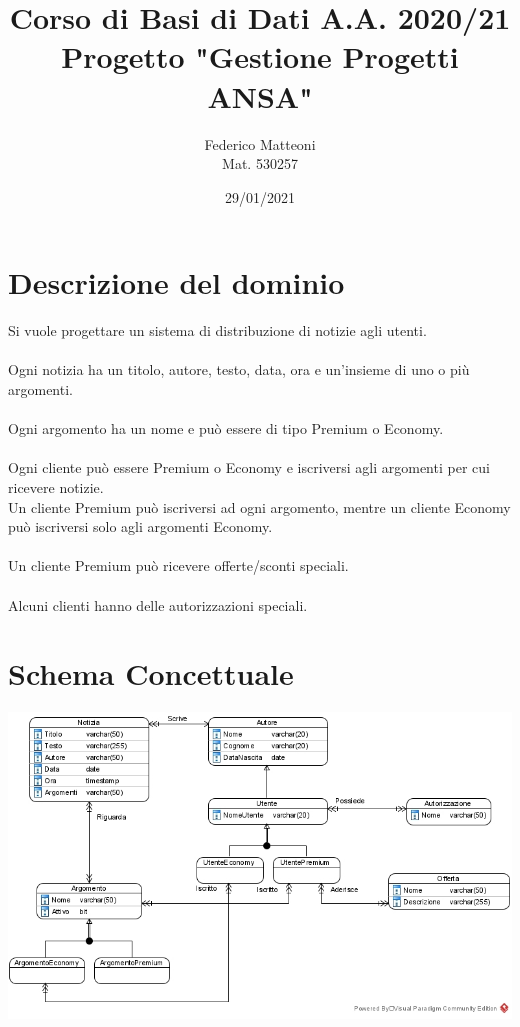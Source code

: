 \documentclass[10pt]{article}
\begin{document}
\renewcommand*\contentsname{Indice}
\title{Corso di Basi di Dati A.A. 2020/21\\Progetto "Gestione Progetti ANSA"}
\author{Federico Matteoni\\Mat. 530257}
\date{29/01/2021}
\maketitle
\pagebreak
\section{Descrizione del dominio}
Si vuole progettare un sistema di distribuzione di notizie agli utenti.\\\\
Ogni notizia ha un titolo, autore, testo, data, ora e un'insieme di uno o più argomenti.\\\\
Ogni argomento ha un nome e può essere di tipo Premium o Economy.\\\\
Ogni cliente può essere Premium o Economy e iscriversi agli argomenti per cui ricevere notizie.\\Un cliente Premium può iscriversi ad ogni argomento, mentre un cliente Economy può iscriversi solo agli argomenti Economy.\\\\
Un cliente Premium può ricevere offerte/sconti speciali.\\\\
Alcuni clienti hanno delle autorizzazioni speciali.
\section{Schema Concettuale}
\begin{center}
	\includegraphics[scale=0.75]{Concettuale.jpg}
\end{center}
\end{document}
